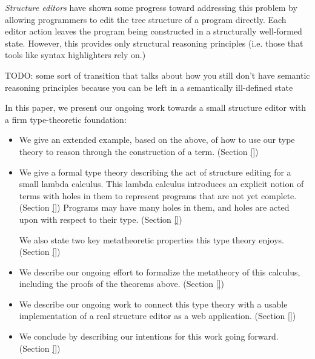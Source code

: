 
\emph{Structure editors} have shown some progress toward addressing this problem by allowing programmers to edit the tree structure of a program directly. Each editor action leaves the program being constructed in a structurally well-formed state. However, this provides only structural reasoning principles (i.e. those that tools like syntax highlighters rely on.) 

TODO: some sort of transition that talks about how you still don't have semantic reasoning principles because you can be left in a semantically ill-defined state

In this paper, we present our ongoing work towards a small {structure
  editor} with a firm type-theoretic foundation:
\begin{itemize}
  \item We give an extended example, based on the above, of how to use our
    type theory to reason through the construction of a term. (Section
    \ref{})

  \item We give a formal type theory describing the act of structure
    editing for a small lambda calculus. This lambda calculus introduces an
    explicit notion of terms with holes in them to represent programs that
    are not yet complete.  (Section \ref{}) Programs may have many holes in
    them, and holes are acted upon with respect to their type. (Section
    \ref{})

    We also state two key metatheoretic properties this type theory
    enjoys. (Section \ref{})

  \item We describe our ongoing effort to formalize the metatheory of this
    calculus, including the proofs of the theorems above. (Section \ref{})

  \item We describe our ongoing work to connect this type theory with a
    usable implementation of a real structure editor as a web
    application. (Section \ref{})

  \item We conclude by describing our intentions for this work going
    forward. (Section \ref{})
\end{itemize}







